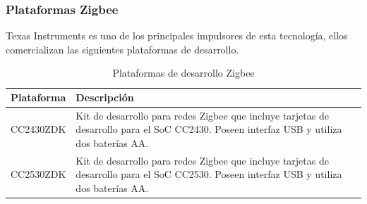\subsubsection{Plataformas Zigbee}
Texas Instruments es uno de los principales impulsores de esta tecnología, ellos comercializan las siguientes plataformas de desarrollo.
\begin{table}[H]
\centering
\caption{Plataformas de desarrollo Zigbee}
\begin{tabular}{|l|p{10cm}|}
\hline \textbf{Plataforma} & \textbf{Descripción} \\ 
\hline CC2430ZDK & Kit de desarrollo para redes Zigbee que incluye tarjetas de desarrollo para el SoC CC2430. Poseen interfaz USB y utiliza dos baterías AA. \\ 
\hline CC2530ZDK & Kit de desarrollo para redes Zigbee que incluye tarjetas de desarrollo para el SoC CC2530. Poseen interfaz USB y utiliza dos baterías AA.\\ 
\hline 
\end{tabular} 
\end{table}

